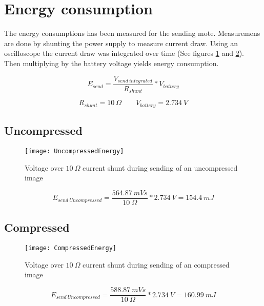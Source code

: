 \section{Energy consumption} 
\label{sec:energy_consumption}
The energy consumptions has been measured for the sending mote.
Measuremens are done by shunting the power supply to measure current draw.
Using an oscilloscope the current draw was integrated over time (See figures \ref{fig:UncompressedSend} and \ref{fig:CompressedSend}).
Then multiplying by the battery voltage yields  energy consumption.

\begin{equation}
E_{send} = 
\dfrac{V_{send\ integrated}}
{R_{shunt}}
* V_{battery}
\end{equation}

\begin{equation}
R_{shunt} = 10\ \Omega
\qquad
V_{battery} = 2.734\ V
\end{equation}


\subsection{Uncompressed}

\begin{figure}[H]
\centering
\texttt{[image: UncompressedEnergy]}
\caption{Voltage over $ 10\ \Omega $ current shunt during sending of an uncompressed image}
\label{fig:UncompressedSend}
\end{figure}

\begin{equation}
E_{send\ Uncompressed} = 
\dfrac{564.87\ mVs}
{10\ \Omega}
* 2.734\ V
=
154.4\ mJ
\end{equation}

\subsection{Compressed}

\begin{figure}[H]
\centering
\texttt{[image: CompressedEnergy]}
\caption{Voltage over $ 10\ \Omega $ current shunt during sending of an compressed image}
\label{fig:CompressedSend}
\end{figure}

\begin{equation}
E_{send\ Uncompressed} = 
\dfrac{588.87\ mVs}
{10\ \Omega}
* 2.734\ V
=
160.99\ mJ
\end{equation}



